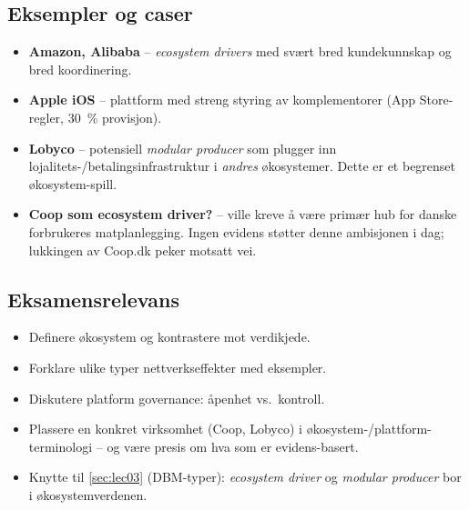 \subsection{Eksempler og caser}
\begin{itemize}
  \item \textbf{Amazon, Alibaba} -- \emph{ecosystem drivers} med svært bred
    kundekunnskap og bred koordinering.
  \item \textbf{Apple iOS} -- plattform med streng styring av komplementorer
    (App Store-regler, 30~\% provisjon).
  \item \textbf{Lobyco} -- potensiell \emph{modular producer} som plugger inn
    lojalitets-/betalingsinfrastruktur i \emph{andres} økosystemer. Dette er
    et begrenset økosystem-spill.
  \item \textbf{Coop som ecosystem driver?} -- ville kreve å være primær hub
    for danske forbrukeres matplanlegging. Ingen evidens støtter denne
    ambisjonen i dag; lukkingen av Coop.dk peker motsatt vei.
\end{itemize}

\subsection{Eksamensrelevans}
\begin{itemize}
  \item Definere økosystem og kontrastere mot verdikjede.
  \item Forklare ulike typer nettverkseffekter med eksempler.
  \item Diskutere platform governance: åpenhet vs.\ kontroll.
  \item Plassere en konkret virksomhet (Coop, Lobyco) i økosystem-/plattform-
    terminologi -- og være presis om hva som er evidens-basert.
  \item Knytte til \autoref{sec:lec03} (DBM-typer): \emph{ecosystem driver} og
    \emph{modular producer} bor i økosystemverdenen.
\end{itemize}
